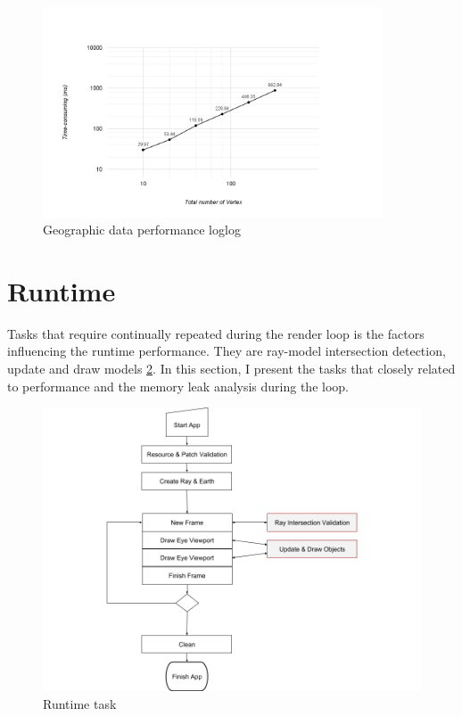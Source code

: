 \begin{figure}[H]
	\caption{Geographic data performance loglog}
	\label{fig:geographic-data-performance-loglog}
	\centering
	\includegraphics[width=0.9\textwidth, keepaspectratio]{Figures/geographic-data-performance-loglog.png}
	\decoRule
\end{figure}

\section{Runtime}

Tasks that require continually repeated during the render loop is the factors influencing the runtime performance. They are ray-model intersection detection, update and draw models \ref{fig:runtime-task}. In this section, I present the tasks that closely related to performance and the memory leak analysis during the loop.
 
\begin{figure}[H]
	\caption{Runtime task}
	\label{fig:runtime-task}
	\centering
	\includegraphics[width=\textwidth, keepaspectratio]{Figures/runtime-task.png}
	\decoRule
\end{figure}


